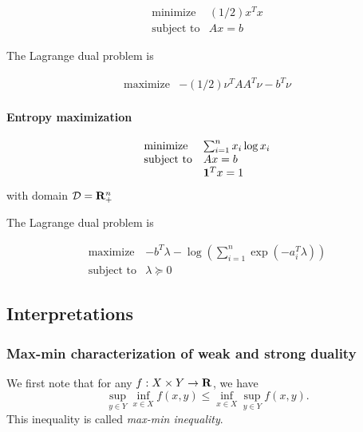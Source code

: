 \begin{equation}
\begin{array}{ll}
\mbox{minimize} & (1/2) x^T x
\\
\mbox{subject to} & Ax = b
\end{array}
\end{equation}

The Lagrange dual problem is

\begin{equation}
\begin{array}{ll}
\mbox{maximize} & -(1/2) \nu^T A A^T \nu - b^T \nu
\end{array}
\end{equation}



\paragraph{Entropy maximization}

\begin{equation}
\begin{array}{ll}
\mbox{minimize} & \sum_{i=1}^n x_i \log x_i
\\
\mbox{subject to} & Ax = b
\\
& \mathbf 1^T x = 1
\end{array}
\end{equation}
with domain $\mathcal{D} = \mathbf{R}^n_+$

The Lagrange dual problem is

\begin{equation}
\begin{array}{ll}
\mbox{maximize} & - b^T \lambda - \log \left( \sum_{i=1}^n \exp(-a_i^T \lambda) \right)
\\
\mbox{subject to} & \lambda  \succeq 0
\end{array}
\end{equation}



\subsection{Interpretations}

\subsubsection{Max-min characterization of weak and strong duality}

We first note that for any $f: X \times Y \to \mathbf{R}$, we have
\begin{equation}
\sup_{y\in Y} \inf_{x\in X} f(x,y)
\leq \inf_{x\in X} \sup_{y\in Y} f(x,y).
\end{equation}
This inequality is called \emph{max-min inequality}.

